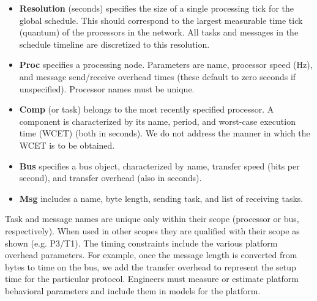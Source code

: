 \begin{itemize}
\item {\bf Resolution} (seconds) specifies the size of a single processing tick for the global schedule.  This should correspond to the largest measurable time tick (quantum) of the processors in the network.  All tasks and messages in the schedule timeline are discretized to this resolution.
\item {\bf Proc} specifies a processing node.  Parameters are name, processor speed (Hz), and message send/receive overhead times (these default to zero seconds if unspecified).  Processor names must be unique.
\item {\bf Comp} (or task) belongs to the most recently specified processor.  A component is characterized by its name, period, and worst-case execution time (WCET) (both in seconds).  We do not address the manner in which the WCET is to be obtained.
\item {\bf Bus} specifies a bus object, characterized by name, transfer speed (bits per second), and transfer overhead (also in seconds).
\item {\bf Msg} includes a name, byte length, sending task, and list of receiving tasks.
\end{itemize}









Task and message names are unique only within 
their scope (processor or bus, respectively).  When used 
in other scopes they are qualified with their scope 
as shown (e.g. P3/T1). The timing constraints include 
the various platform overhead parameters.  For example, 
once the message length is converted from bytes to time on 
the bus, we add the transfer overhead to represent the 
setup time for the particular protocol.  Engineers 
must measure or estimate platform behavioral parameters 
and include them in models for the 
platform\cite{modeling:platform}.

